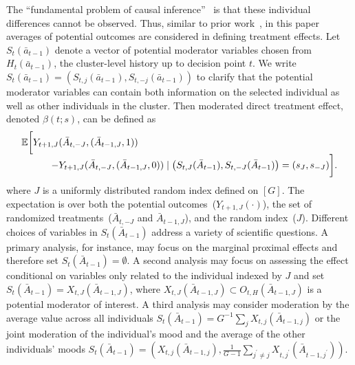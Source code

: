 \documentclass[12pt]{article}
\newcommand{\zw}[1]{\textcolor{blue}{[\textit{ZW: #1}]}}
\begin{document}
The ``fundamental problem of causal inference''~\citep{Rubin, Pearl2009} is that these individual differences cannot be observed. Thus, similar to prior work~\citep{DempseyAOAS, Boruvkaetal}, in this paper averages of potential outcomes are considered in defining treatment effects. Let $S_t (\bar a_{t-1})$ denote a vector of potential moderator variables chosen from $H_t (\bar a_{t-1})$, the cluster-level history up to decision point $t$.  We write $S_t (\bar a_{t-1}) = \left( S_{t,j} (\bar a_{t-1}), S_{t,-j} (\bar a_{t-1}) \right)$ to clarify that the potential moderator variables can contain both information on the selected individual as well as other individuals in the cluster. Then moderated direct treatment effect, denoted $\beta (t; s)$, can be defined as
\begin{equation}
\label{eq:directavglineareffect}
\begin{array}{r@{}l}
\mathbb{E} \bigg[ Y_{t+1,J} &(\bar A_{t,-J}, (\bar A_{t-1,J}, 1)) \\
- &Y_{t+1,J} (\bar A_{t,-J}, (\bar A_{t-1,J}, 0)) \mid \left( S_{t,J} (\bar A_{t-1}), S_{t,-J} (\bar A_{t-1}) \right) = (s_J, s_{-J}) \bigg].
\end{array}
\end{equation}
where $J$ is a uniformly distributed random index defined on $[G]$. The expectation is over both the potential outcomes~($Y_{t+1,J}(\cdot)$), the set of randomized treatments~($\bar A_{t,-J}$ and $\bar A_{t-1,J}$), and the random index~($J$).
Different choices of variables in $S_t (\bar A_{t-1})$ address a variety of scientific questions.  A primary analysis, for instance, may focus on the marginal proximal effects and therefore set $S_t (\bar A_{t-1}) = \emptyset$.  A second analysis may focus on assessing the effect conditional on variables only related to the individual indexed by $J$ and set $S_t (\bar A_{t-1}) = X_{t,J} (\bar A_{t-1,J})$, where $X_{t,J} (\bar A_{t-1,J}) \subset O_{t,H} (\bar A_{t-1,J})$ is a potential moderator of interest.  A third analysis may consider moderation by the average value across all individuals $S_t (\bar A_{t-1}) = G^{-1} \sum_j X_{t,j} (\bar A_{t-1,j})$ or the joint moderation of the individual's mood and the average of the other individuals' moods $S_t (\bar A_{t-1}) = \left( X_{t,j}(\bar A_{t-1,j}), \frac{1}{G-1} \sum_{j^\prime \neq j} X_{t,j^\prime} (\bar A_{t-1,j^\prime}) \right)$.
\end{document}
